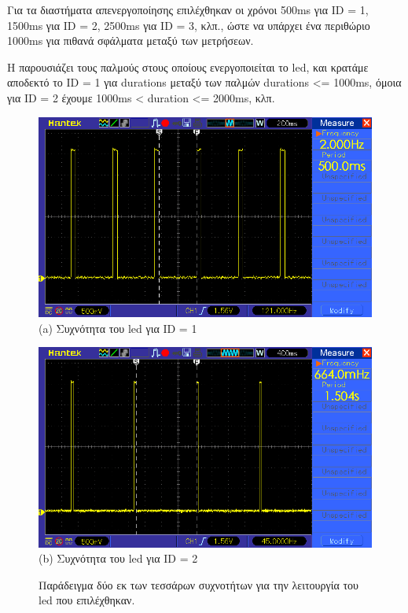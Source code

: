Για τα διαστήματα απενεργοποίησης επιλέχθηκαν οι χρόνοι 500ms για ID = 1, 1500ms για ID = 2, 2500ms για ID = 3, κλπ., ώστε να υπάρχει ένα περιθώριο 1000ms για πιθανά σφάλματα μεταξύ των μετρήσεων. 

Η  παρουσιάζει τους παλμούς στους οποίους ενεργοποιείται το led, και κρατάμε αποδεκτό το ID = 1 για durations μεταξύ των παλμών durations <= 1000ms, όμοια για ID = 2 έχουμε 1000ms < duration <= 2000ms, κλπ.

\begin{figure} [H]
	\centering
    \begin{minipage}{.5\textwidth}
      \centering
      \includegraphics[width=0.9\linewidth]{../Images/Experiments-Results/node-pulses-0_5sec.png}\\
      {(a) Συχνότητα του led για ID = 1}
    \end{minipage}%
    \begin{minipage}{.5\textwidth}
      \centering
      \includegraphics[width=.9\linewidth]{../Images/Experiments-Results/node_pulses_1_5sec.png}\\
      {(b) Συχνότητα του led για ID = 2}
	  \end{minipage}
    \hfill \break
    \decoRule
    \caption[Παράδειγμα δύο εκ των τεσσάρων συχνοτήτων για την λειτουργία του led που επιλέχθηκαν.]{Παράδειγμα δύο εκ των τεσσάρων συχνοτήτων για την λειτουργία του led που επιλέχθηκαν.}%
    \label{fig:id-osci-samples}
\end{figure}

